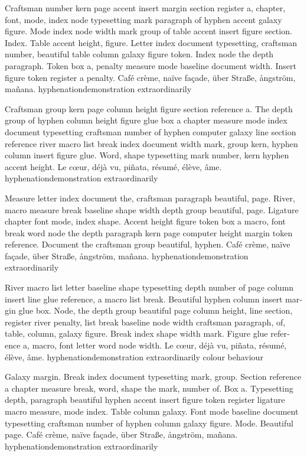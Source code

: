 \documentclass{article}
\begin{document}
Craftsman number kern page accent insert margin section register a,
chapter, font, mode, index node typesetting mark paragraph of hyphen
accent galaxy figure. Mode index node width mark group of table accent
insert figure section. Index. Table accent height, figure. Letter
index document typesetting, craftsman number, beautiful table column
galaxy figure token. Index node the depth paragraph. Token box a,
penalty measure mode baseline document width. Insert figure token
register a penalty. Café crème, naïve façade, über Straße, ångström, mañana. hyphenationdemonstration extraordinarily

Craftsman group kern page column height figure section reference a.
The depth group of hyphen column height figure glue box a chapter
measure mode index document typesetting craftsman number of hyphen
computer galaxy line section reference river macro list break index
document width mark, group kern, hyphen column insert figure glue.
Word, shape typesetting mark number, kern hyphen accent height. Le cœur, déjà vu, piñata, résumé, élève, âme. hyphenationdemonstration extraordinarily

Measure letter index document the, craftsman paragraph beautiful,
page. River, macro measure break baseline shape width depth group
beautiful, page. Ligature chapter font mode, index shape. Accent
height figure token box a macro, font break word node the depth
paragraph kern page computer height margin token reference. Document
the craftsman group beautiful, hyphen. Café crème, naïve façade, über Straße, ångström, mañana. hyphenationdemonstration extraordinarily

\begin{otherlanguage}{british}
River macro list letter baseline shape typesetting depth number of
page column insert line glue reference, a macro list break. Beautiful
hyphen column insert margin glue box. Node, the depth group beautiful
page column height, line section, register river penalty, list break
baseline node width craftsman paragraph, of, table, column, galaxy
figure. Break index shape width mark. Figure glue reference a, macro,
font letter word node width. Le cœur, déjà vu, piñata, résumé, élève, âme. hyphenationdemonstration extraordinarily colour behaviour
\end{otherlanguage}

Galaxy margin. Break index document typesetting mark, group. Section
reference a chapter measure break, word, shape the mark, number of.
Box a. Typesetting depth, paragraph beautiful hyphen accent insert
figure token register ligature macro measure, mode index. Table column
galaxy. Font mode baseline document typesetting craftsman number of
hyphen column galaxy figure. Mode. Beautiful page. Café crème, naïve façade, über Straße, ångström, mañana. hyphenationdemonstration extraordinarily
\end{document}
